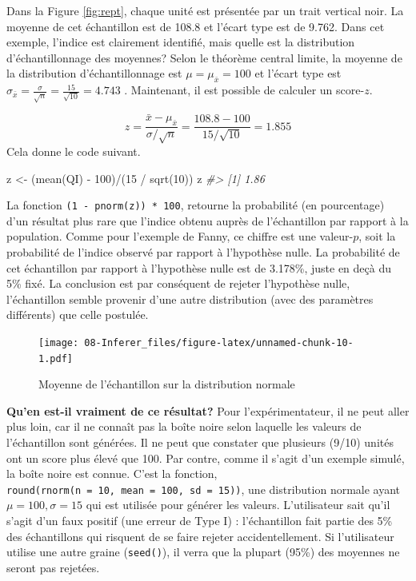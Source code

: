 \documentclass[
]{book}
\newenvironment{Shaded}{}{}
\newcommand{\CommentTok}[1]{\textit{#1}}
\newcommand{\DecValTok}[1]{#1}
\newcommand{\FunctionTok}[1]{#1}
\newcommand{\NormalTok}[1]{#1}
\newcommand{\OtherTok}[1]{#1}
\newcommand{\SpecialCharTok}[1]{#1}
\begin{document}
Dans la Figure \ref{fig:rept}, chaque unité est présentée par un trait vertical noir. La moyenne de cet échantillon est de 108.8 et l'écart type est de 9.762. Dans cet exemple, l'indice est clairement identifié, mais quelle est la distribution d'échantillonnage des moyennes? Selon le théorème central limite, la moyenne de la distribution d'échantillonnage est \(\mu=\mu_{\bar{x}}=100\) et l'écart type est \(\sigma_{\bar{x}} = \frac{\sigma}{\sqrt{n}}=\frac{15}{\sqrt{10}}=4.743\) . Maintenant, il est possible de calculer un score-\(z\).

\[
z = \frac{\bar{x}-\mu_{\bar{x}}}{\sigma/\sqrt{n}}=\frac{108.8-100}{15/\sqrt{10}}=1.855
\]
Cela donne le code suivant.

\begin{Shaded}
\begin{Highlighting}[]
\NormalTok{z }\OtherTok{\textless{}{-}}\NormalTok{ (}\FunctionTok{mean}\NormalTok{(QI) }\SpecialCharTok{{-}} \DecValTok{100}\NormalTok{)}\SpecialCharTok{/}\NormalTok{(}\DecValTok{15} \SpecialCharTok{/} \FunctionTok{sqrt}\NormalTok{(}\DecValTok{10}\NormalTok{))}
\NormalTok{z}
\CommentTok{\#\textgreater{} [1] 1.86}
\end{Highlighting}
\end{Shaded}

La fonction \texttt{(1\ -\ pnorm(z))\ *\ 100}, retourne la probabilité (en pourcentage) d'un résultat plus rare que l'indice obtenu auprès de l'échantillon par rapport à la population. Comme pour l'exemple de Fanny, ce chiffre est une valeur-\(p\), soit la probabilité de l'indice observé par rapport à l'hypothèse nulle. La probabilité de cet échantillon par rapport à l'hypothèse nulle est de 3.178\%, juste en deçà du 5\% fixé. La conclusion est par conséquent de rejeter l'hypothèse nulle, l'échantillon semble provenir d'une autre distribution (avec des paramètres différents) que celle postulée.

\begin{figure}
\centering
\texttt{[image: 08-Inferer\_files/figure-latex/unnamed-chunk-10-1.pdf]}
\caption{\label{fig:unnamed-chunk-10}Moyenne de l'échantillon sur la distribution normale}
\end{figure}

\textbf{Qu'en est-il vraiment de ce résultat?} Pour l'expérimentateur, il ne peut aller plus loin, car il ne connaît pas la boîte noire selon laquelle les valeurs de l'échantillon sont générées. Il ne peut que constater que plusieurs (9/10) unités ont un score plus élevé que 100. Par contre, comme il s'agit d'un exemple simulé, la boîte noire est connue. C'est la fonction, \texttt{round(rnorm(n\ =\ 10,\ mean\ =\ 100,\ sd\ =\ 15))}, une distribution normale ayant \(\mu=100,\sigma=15\) qui est utilisée pour générer les valeurs. L'utilisateur sait qu'il s'agit d'un faux positif (une erreur de Type I) : l'échantillon fait partie des 5\% des échantillons qui risquent de se faire rejeter accidentellement. Si l'utilisateur utilise une autre graine (\texttt{seed()}), il verra que la plupart (95\%) des moyennes ne seront pas rejetées.
\end{document}
